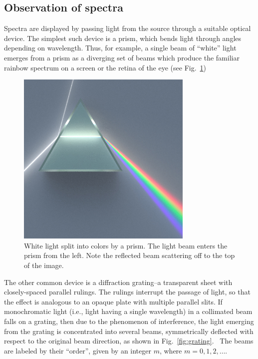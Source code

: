 \subsection{Observation of spectra}

Spectra are displayed by passing light from the source through a 
suitable optical device. The simplest such device is a prism, which
bends light through angles depending on wavelength. Thus, for
example, a single beam of ``white'' light
emerges from a prism as a diverging set of beams which produce the
familiar rainbow spectrum on a screen or the retina of the eye (see
Fig.~\ref{fig:prism})

\begin{figure}
\begin{centering}
 \includegraphics[width=0.75\textwidth]{../images/Dispersive_Prism.jpg} 
\caption{White light split into colors by a prism.  The light beam enters the
  prism from the left. Note the reflected beam scattering off to the top of the
  image.}
\label{fig:prism}
\end{centering}
\end{figure}

The other common device is a diffraction grating--a transparent sheet
with closely-spaced parallel rulings. The rulings interrupt the
passage of light, so that the effect is analogous to an opaque plate
with multiple parallel slits. If monochromatic light (i.e., light
having a single wavelength) in a collimated beam falls on a grating,
then due to the phenomenon of interference, the light emerging from the
grating is concentrated into several beams, symmetrically deflected
with respect to the original beam direction, as shown in Fig.~\ref{fig:grating}. \ The
beams are labeled by their ``order'', given
by an integer $m$, where $m = 0,1,2,\ldots$.

